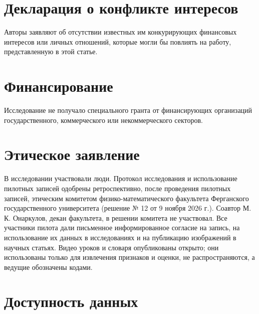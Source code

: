 \documentclass[a4paper,fleqn]{cas-dc}
\begin{document}
\hypertarget{ux434ux435ux43aux43bux430ux440ux430ux446ux438ux44f-ux43e-ux43aux43eux43dux444ux43bux438ux43aux442ux435-ux438ux43dux442ux435ux440ux435ux441ux43eux432}{%
\section*{Декларация о конфликте интересов}\label{ux434ux435ux43aux43bux430ux440ux430ux446ux438ux44f-ux43e-ux43aux43eux43dux444ux43bux438ux43aux442ux435-ux438ux43dux442ux435ux440ux435ux441ux43eux432}}

Авторы заявляют об отсутствии известных им конкурирующих финансовых интересов или личных отношений, которые могли бы повлиять на работу, представленную в этой статье.

\hypertarget{ux444ux438ux43dux430ux43dux441ux438ux440ux43eux432ux430ux43dux438ux435}{%
\section*{Финансирование}\label{ux444ux438ux43dux430ux43dux441ux438ux440ux43eux432ux430ux43dux438ux435}}

Исследование не получало специального гранта от финансирующих организаций государственного, коммерческого или некоммерческого секторов.

\hypertarget{ux44dux442ux438ux447ux435ux441ux43aux43eux435-ux437ux430ux44fux432ux43bux435ux43dux438ux435}{%
\section*{Этическое заявление}\label{ux44dux442ux438ux447ux435ux441ux43aux43eux435-ux437ux430ux44fux432ux43bux435ux43dux438ux435}}

В исследовании участвовали люди. Протокол исследования и использование пилотных записей одобрены ретроспективно, после проведения пилотных записей, этическим комитетом физико-математического факультета Ферганского государственного университета (решение № 12 от 9 ноября 2026 г.). Соавтор М. К. Онаркулов, декан факультета, в решении комитета не участвовал. Все участники пилота дали письменное информированное согласие на запись, на использование их данных в исследованиях и на публикацию изображений в научных статьях. Видео уроков и словаря опубликованы открыто; они использованы только для извлечения признаков и оценки, не распространяются, а ведущие обозначены кодами.

\hypertarget{ux434ux43eux441ux442ux443ux43fux43dux43eux441ux442ux44c-ux434ux430ux43dux43dux44bux445}{%
\section*{Доступность данных}\label{ux434ux43eux441ux442ux443ux43fux43dux43eux441ux442ux44c-ux434ux430ux43dux43dux44bux445}}
\end{document}

